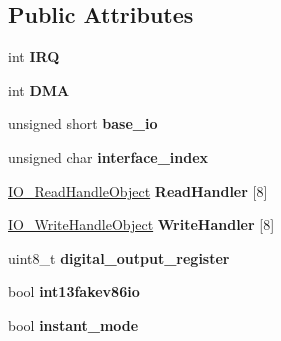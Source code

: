 \subsection*{Public Attributes}
\begin{DoxyCompactItemize}
\item 
\hypertarget{classFloppyController_abb12e3b2751a5355d29e8e5b7119460a}{int {\bfseries I\-R\-Q}}\label{classFloppyController_abb12e3b2751a5355d29e8e5b7119460a}

\item 
\hypertarget{classFloppyController_a409410010aa9128f53c6012d43a73d21}{int {\bfseries D\-M\-A}}\label{classFloppyController_a409410010aa9128f53c6012d43a73d21}

\item 
\hypertarget{classFloppyController_a5e87e5f206beb1d022487c72fe31d653}{unsigned short {\bfseries base\-\_\-io}}\label{classFloppyController_a5e87e5f206beb1d022487c72fe31d653}

\item 
\hypertarget{classFloppyController_a0ffe23370e6073c3ac357382ed00c2a5}{unsigned char {\bfseries interface\-\_\-index}}\label{classFloppyController_a0ffe23370e6073c3ac357382ed00c2a5}

\item 
\hypertarget{classFloppyController_a5d27968ea27a204b7d8dfc933cffad21}{\hyperlink{classIO__ReadHandleObject}{I\-O\-\_\-\-Read\-Handle\-Object} {\bfseries Read\-Handler} \mbox{[}8\mbox{]}}\label{classFloppyController_a5d27968ea27a204b7d8dfc933cffad21}

\item 
\hypertarget{classFloppyController_a4a7039f98831ba672e33a5aae3023c4b}{\hyperlink{classIO__WriteHandleObject}{I\-O\-\_\-\-Write\-Handle\-Object} {\bfseries Write\-Handler} \mbox{[}8\mbox{]}}\label{classFloppyController_a4a7039f98831ba672e33a5aae3023c4b}

\item 
\hypertarget{classFloppyController_a5ea31c6fb6134b42dd2c4a8b4efce7f6}{uint8\-\_\-t {\bfseries digital\-\_\-output\-\_\-register}}\label{classFloppyController_a5ea31c6fb6134b42dd2c4a8b4efce7f6}

\item 
\hypertarget{classFloppyController_a9d92e2786c273c302437cffdc636788e}{bool {\bfseries int13fakev86io}}\label{classFloppyController_a9d92e2786c273c302437cffdc636788e}

\item 
\hypertarget{classFloppyController_a80344884f3a66608cd0ad21220502012}{bool {\bfseries instant\-\_\-mode}}\label{classFloppyController_a80344884f3a66608cd0ad21220502012}


\end{DoxyCompactItemize}
